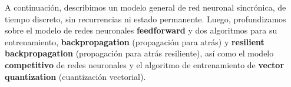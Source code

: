 A continuación, describimos un modelo general de red neuronal sincrónica, de tiempo discreto, sin recurrencias ni estado permanente. Luego, profundizamos sobre el modelo de redes neuronales \textbf{feedforward} y dos algoritmos para su entrenamiento, \textbf{backpropagation} (propagación para atrás) y \textbf{resilient backpropagation} (propagación para atrás resiliente), así como el modelo \textbf{competitivo} de redes neuronales y el algoritmo de entrenamiento de \textbf{vector quantization} (cuantización vectorial).


